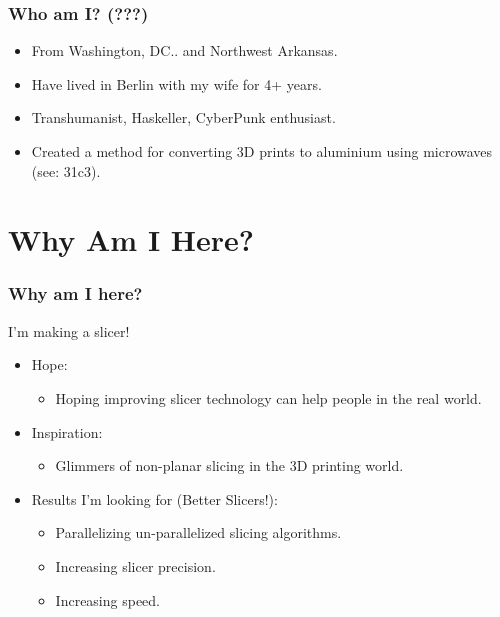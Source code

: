 \documentclass[hyperref={pdfpagemode=FullScreen},aspectratio=169]{beamer}
\begin{document}

\begin{frame}
  \frametitle{Who am I? (???)}
  \begin{itemize}
  \item From Washington, DC.. and Northwest Arkansas.
  \item Have lived in Berlin with my wife for 4+ years.
  \item Transhumanist, Haskeller, CyberPunk enthusiast.
  \item Created a method for converting 3D prints to aluminium using microwaves (see: 31c3).
  \end{itemize}
\end{frame}


\section{Why Am I Here?}

\begin{frame}
  \frametitle{Why am I here?}
    I'm making a slicer!
  \begin{itemize}
  \item Hope:
    \begin{itemize}
    \item Hoping improving slicer technology can help people in the real world.
    \end{itemize}
  \item Inspiration:
    \begin{itemize}
    \item Glimmers of non-planar slicing in the 3D printing world.
    \end{itemize}
  \item Results I'm looking for (Better Slicers!):
    \begin{itemize}
    \item Parallelizing un-parallelized slicing algorithms.
    \item Increasing slicer precision.
    \item Increasing speed.
    \end{itemize}
  \end{itemize}
\end{frame}
\end{document}
